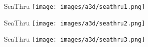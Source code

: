 \begin{frame}{SeaThru}
    \centering
    \texttt{[image: images/a3d/seathru1.png]}
\end{frame}

\begin{frame}{SeaThru}
    \centering
    \texttt{[image: images/a3d/seathru2.png]}
\end{frame}

\begin{frame}{SeaThru}
    \centering
    \texttt{[image: images/a3d/seathru3.png]}
\end{frame}





